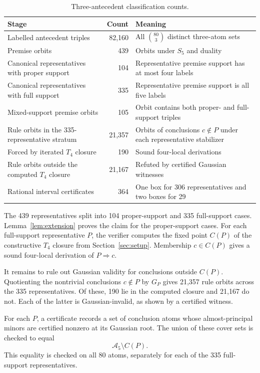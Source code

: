 \documentclass[10pt]{article}
\theoremstyle{definition}
\newcommand{\A}{\mathcal A}
\newcommand{\Tfour}{T_4}
\begin{document}
\begin{table}[ht]
\centering
\caption{Three-antecedent classification counts.}
\label{tab:counts}
\begin{tabular}{P{5.5cm}rP{7.1cm}}
\toprule
Stage & Count & Meaning\\
\midrule
Labelled antecedent triples & 82,160 & All $\binom{80}{3}$ distinct three-atom sets\\
Premise orbits & 439 & Orbits under $S_5$ and duality\\
Canonical representatives with proper support & 104 & Representative premise support has at most four labels\\
Canonical representatives with full support & 335 & Representative premise support is all five labels\\
Mixed-support premise orbits & 105 & Orbit contains both proper- and full-support triples\\
Rule orbits in the 335-representative stratum & 21,357 & Orbits of conclusions $c\notin P$ under each representative stabilizer\\
Forced by iterated $\Tfour$ closure & 190 & Sound four-local derivations\\
Rule orbits outside the computed $\Tfour$ closure & 21,167 & Refuted by certified Gaussian witnesses\\
Rational interval certificates & 364 & One box for 306 representatives and two boxes for 29\\
\bottomrule
\end{tabular}
\end{table}

The 439 representatives split into 104 proper-support and 335 full-support cases.  Lemma~\ref{lem:extension} proves the claim for the proper-support cases.  For each full-support representative $P$, the verifier computes the fixed point $C(P)$ of the constructive $\Tfour$ closure from Section~\ref{sec:setup}.  Membership $c\in C(P)$ gives a sound four-local derivation of $P\Rightarrow c$.

It remains to rule out Gaussian validity for conclusions outside $C(P)$.  Quotienting the nontrivial conclusions $c\notin P$ by $G_P$ gives 21,357 rule orbits across the 335 representatives.  Of these, 190 lie in the computed closure and 21,167 do not.  Each of the latter is Gaussian-invalid, as shown by a certified witness.

For each $P$, a certificate records a set of conclusion atoms whose almost-principal minors are certified nonzero at its Gaussian root.  The union of these cover sets is checked to equal
\[
 \A_5\setminus C(P).
\]
This equality is checked on all 80 atoms, separately for each of the 335 full-support representatives.
\end{document}
